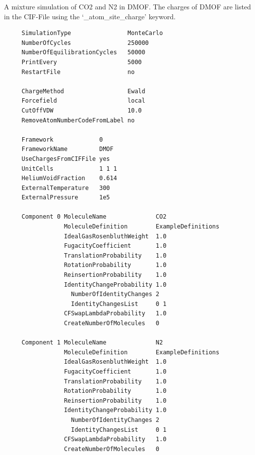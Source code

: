 A mixture simulation of CO2 and N2 in DMOF. The charges of DMOF are listed in the CIF-File using the `\_atom\_site\_charge' keyword.
\begin{tiny}
\begin{verbatim}
     SimulationType                MonteCarlo
     NumberOfCycles                250000
     NumberOfEquilibrationCycles   50000
     PrintEvery                    5000
     RestartFile                   no
     
     ChargeMethod                  Ewald
     Forcefield                    local
     CutOffVDW                     10.0
     RemoveAtomNumberCodeFromLabel no
     
     Framework             0
     FrameworkName         DMOF
     UseChargesFromCIFFile yes
     UnitCells             1 1 1
     HeliumVoidFraction    0.614
     ExternalTemperature   300
     ExternalPressure      1e5
     
     Component 0 MoleculeName              CO2
                 MoleculeDefinition        ExampleDefinitions
                 IdealGasRosenbluthWeight  1.0
                 FugacityCoefficient       1.0
                 TranslationProbability    1.0
                 RotationProbability       1.0
                 ReinsertionProbability    1.0
                 IdentityChangeProbability 1.0
                   NumberOfIdentityChanges 2
                   IdentityChangesList     0 1
                 CFSwapLambdaProbability   1.0
                 CreateNumberOfMolecules   0
     
     Component 1 MoleculeName              N2
                 MoleculeDefinition        ExampleDefinitions
                 IdealGasRosenbluthWeight  1.0
                 FugacityCoefficient       1.0
                 TranslationProbability    1.0
                 RotationProbability       1.0
                 ReinsertionProbability    1.0
                 IdentityChangeProbability 1.0
                   NumberOfIdentityChanges 2
                   IdentityChangesList     0 1
                 CFSwapLambdaProbability   1.0
                 CreateNumberOfMolecules   0
\end{verbatim}
\end{tiny}

